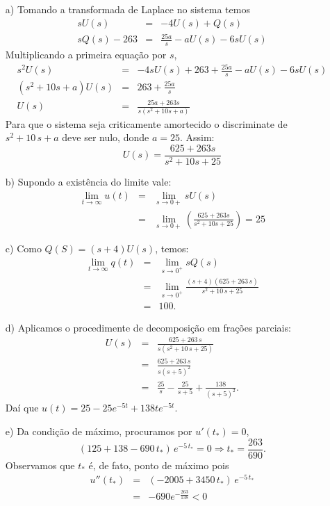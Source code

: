 \begin{resol}
\begin{itemize}
\item [a)] Tomando a transformada de Laplace no sistema temos
\begin{eqnarray*}
sU(s) &=& -4 U(s) + Q(s)\\
sQ(s)-263 &=& \frac{25a}{s}-aU(s)-6sU(s)
\end{eqnarray*}
Multiplicando a primeira equação por $s$,
\begin{eqnarray*}
s^2U(s) &=& -4s U(s) + 263 + \frac{25a}{s}-a U(s)-6 s U(s)\\
\left(s^2+10s+a\right)U(s) &=& 263 + \frac{25a}{s}\\
U(s) &=& \frac{25a +263s}{s(s^2+10s+a)}
\end{eqnarray*}
Para que o sistema seja criticamente amortecido o discriminate de $s^2+10\,s+a$ deve ser nulo, donde $a=25$. Assim:
$$U(s) = \frac{625 +263s}{s^2+10s+25}$$
\item[b)] Supondo a existência do limite vale:
\begin{eqnarray*}
       \lim_{t \to \infty} u(t)&=&\lim_{s \to 0+} sU(s)\\
       &=&\lim_{s \to 0+} \left( \frac{625 +263s}{s^2+10s+25}\right)=25
\end{eqnarray*}

\item[c)] Como $Q(S)=(s+4)U(s)$, temos:
\begin{eqnarray*}
 \lim_{t\to\infty}q(t)&=&\lim_{s\to 0^+}sQ(s)\\
 &=&\lim_{s\to 0^+}\frac{(s+4)(625 +263\,s)}{s^2+10\,s+25}\\
 &=&100.
\end{eqnarray*}

\item[d)] Aplicamos o procedimente de decomposição em frações parciais:
\begin{eqnarray*}
U(s)&=&\frac{625+263\,s}{s(s^2+10\,s+25)}\\
&=&\frac{625+263\,s}{s(s+5)^2}\\
&=&\frac{25}{s}-\frac{25}{s+5}+\frac{138}{(s+5)^2}.
\end{eqnarray*}
Daí que $u(t)=25-25e^{-5t}+138te^{-5t}$.

\item[e)] Da condição de máximo, procuramos por $u'(t_\ast)=0$,
$$
  \left(125+138-690\,t_\ast\right)\,e^{-5\,t_\ast}=0
  \Longrightarrow t_\ast=\frac{263}{690}.
$$
Observamos que $t_\ast$ é, de fato, ponto de máximo pois 
\begin{eqnarray*}
       u''(t_\ast)&=&\left(-2005+3450\,t_\ast\right)\,e^{-5\,t_\ast}\\
       &=&-690e^{-\frac{263}{138}}<0
\end{eqnarray*}


\end{itemize}
\end{resol}
